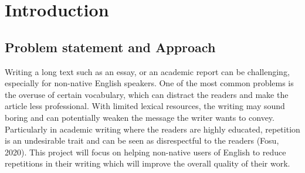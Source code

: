 \documentclass[12pt,oneside,openright,a4paper]{cpe-english-project}
\begin{document}




\chapter{Introduction}

\section{Problem statement and Approach} 

Writing a long text such as an essay, or an academic report can be challenging, especially for non-native English speakers. One of the most common problems is the overuse of certain vocabulary, which can distract the readers and make the article less professional. With limited lexical resources, the writing may sound boring and can potentially weaken the message the writer wants to convey. Particularly in academic writing where the readers are highly educated, repetition is an undesirable trait and can be seen as disrespectful to the readers (Fosu, 2020\cite{a}). This project will focus on helping non-native users of English to reduce repetitions in their writing which will improve the overall quality of their work.
\end{document}
